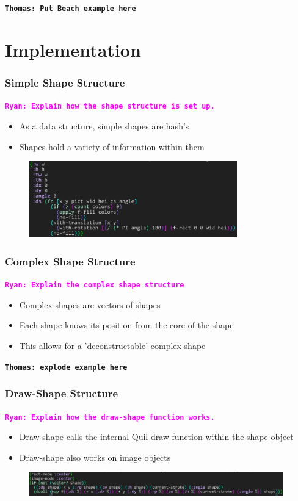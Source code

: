\documentclass{beamer}
\newcommand{\comment}[1]{{\bf \tt  {#1}}}
\newcommand{\thcomment}[1]{\textcolor{BestBlue}{\comment{Thomas: {#1}}}}
\newcommand{\rmcomment}[1]{\textcolor{magenta}{\comment{Ryan: {#1}}}}
\begin{document}
\thcomment{Put Beach example here}

\section{Implementation}

\begin{frame}
\frametitle{Simple Shape Structure}
\rmcomment{Explain how the shape structure is set up.}
	\begin{itemize}
		\item As a data structure, simple shapes are hash's
		\item Shapes hold a variety of information within them
	\end{itemize}
	\begin{figure}
		\includegraphics[width=9cm]{PresentationImages/rectHashmap.png}
	\end{figure}
\end{frame}

\begin{frame}
\frametitle{Complex Shape Structure}
\rmcomment{Explain the complex shape structure}
	\begin{itemize}
		\item Complex shapes are vectors of shapes
		\item Each shape knows its position from the core of the shape
		\item This allows for a 'deconstructable' complex shape
	\end{itemize}
	\thcomment{explode example here}
\end{frame}

\begin{frame}
\frametitle{Draw-Shape Structure}
\rmcomment{Explain how the draw-shape function works.}
	\begin{itemize}
		\item Draw-shape calls the internal Quil draw function within the shape object
		\item Draw-shape also works on image objects
	\end{itemize}
	\begin{figure}
		\includegraphics[width=11cm]{PresentationImages/dsCode.png}
	\end{figure}
\end{frame}
\end{document}

